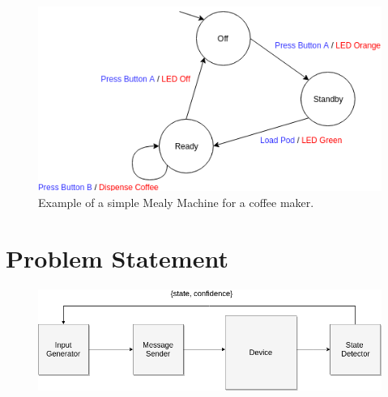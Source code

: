 \documentclass[11pt, a4paper]{article}
\begin{document}

\begin{figure}[!h]
    \hspace*{2cm}\includegraphics[scale=0.5]{coffee}
    \caption{Example of a simple Mealy Machine for a coffee maker.}
    \label{coffee}
\end{figure}

\section*{Problem Statement} 
\begin{figure}[!h]
    \centering
    \includegraphics[scale=0.5]{state-detector.png}
    \label{The system under active model learning.}
\end{figure}
\end{document}

